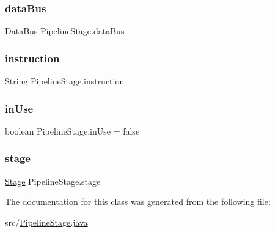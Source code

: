 \subsubsection{\texorpdfstring{data\+Bus}{dataBus}}
{\footnotesize\ttfamily \mbox{\hyperlink{class_data_bus}{Data\+Bus}} Pipeline\+Stage.\+data\+Bus\hspace{0.3cm}{\ttfamily [private]}}

\mbox{\label{class_pipeline_stage_a489ee0d4b3d0eee31ec60b9cb24a0e36}} 
\subsubsection{\texorpdfstring{instruction}{instruction}}
{\footnotesize\ttfamily String Pipeline\+Stage.\+instruction\hspace{0.3cm}{\ttfamily [private]}}

\mbox{\label{class_pipeline_stage_a3ac73b767158fba9e6875514845d1d97}} 
\subsubsection{\texorpdfstring{in\+Use}{inUse}}
{\footnotesize\ttfamily boolean Pipeline\+Stage.\+in\+Use = false\hspace{0.3cm}{\ttfamily [private]}}

\mbox{\label{class_pipeline_stage_a8e9a5f7315a4d88213c4ad0949048f34}} 
\subsubsection{\texorpdfstring{stage}{stage}}
{\footnotesize\ttfamily \mbox{\hyperlink{enum_stage}{Stage}} Pipeline\+Stage.\+stage\hspace{0.3cm}{\ttfamily [private]}}



The documentation for this class was generated from the following file\+:\begin{DoxyCompactItemize}
\item 
src/\mbox{\hyperlink{_pipeline_stage_8java}{Pipeline\+Stage.\+java}}\end{DoxyCompactItemize}
